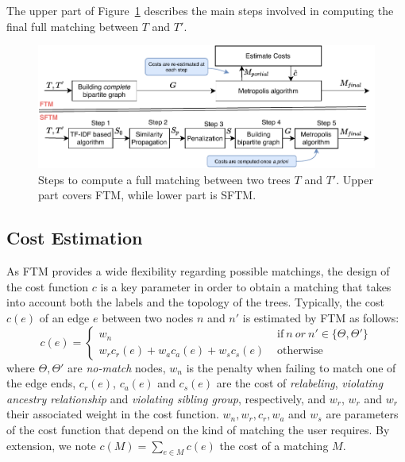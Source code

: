 The upper part of Figure~\ref{fig:steps} describes the main steps involved in computing the final full matching between $T$ and $T'$.

\begin{figure}
    \centering
	\includegraphics[width=\linewidth]{tree-matching/explanation/ftm-sftm-steps}
    \caption{Steps to compute a full matching between two trees $T$ and $T'$. Upper part covers FTM, while lower part is SFTM.}
    \label{fig:steps}
\end{figure}

\subsection{Cost Estimation}\label{sec:FTM_cost}
As FTM provides a wide flexibility regarding possible matchings, the design of the cost function $c$ is a key parameter in order to obtain a matching that takes into account both the labels and the topology of the trees.
Typically, the cost $c(e)$ of an edge $e$ between two nodes $n$ and $n'$ is estimated by FTM as follows:
\begin{equation}\label{eq:FTM_cost}
c(e) =
\begin{cases}
    w_n                                  & \text{ if}\ n\ or\ n' \in \{\Theta, \Theta'\} \\
    w_r c_r(e) + w_a c_a(e) + w_s c_s(e) & \text{ otherwise}
\end{cases}
\end{equation} 
where $\Theta, \Theta'$ are \textit{no-match} nodes, $w_n$ is the penalty when failing to match one of the edge ends, $c_r(e)$, $c_a(e)$ and $c_s(e)$ are the cost of \textit{relabeling}, \textit{violating ancestry relationship} and \textit{violating sibling group}, respectively, and $w_r$, $w_r$ and $w_r$ their associated weight in the cost function.
$w_n, w_r, c_r, w_a$ and $w_s$ are parameters of the cost function that depend on the kind of matching the user requires.
By extension, we note $c(M) = \sum_{e \in M} c(e)$ the cost of a matching $M$.

